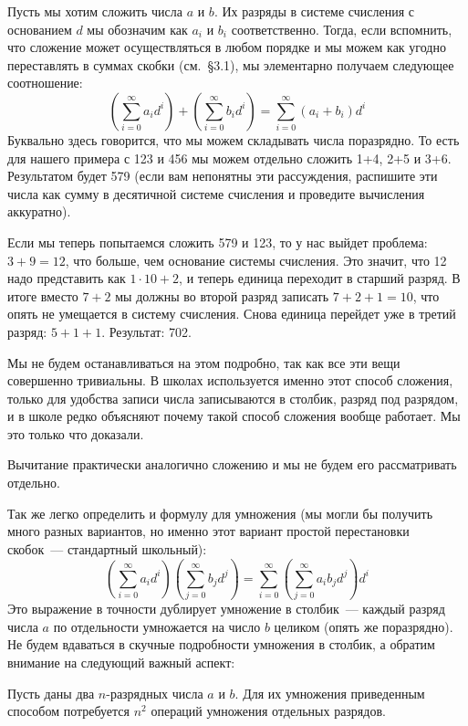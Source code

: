 Пусть мы хотим сложить числа $a$ и $b$. Их разряды в системе счисления с основанием $d$ мы обозначим как $a_i$ и $b_i$ соответственно. Тогда, если вспомнить, что сложение может осуществляться в любом порядке и мы можем как угодно переставлять в суммах скобки (см.~\S3.1), мы элементарно получаем следующее соотношение:
$$\left(\sum_{i=0}^\infty a_i d^i\right) + \left(\sum_{i=0}^\infty b_i d^i\right) = \sum_{i=0}^\infty (a_i + b_i) d^i$$
Буквально здесь говорится, что мы можем складывать числа поразрядно. То есть для нашего примера с 123 и 456 мы можем отдельно сложить 1+4, 2+5 и 3+6. Результатом будет 579 (если вам непонятны эти рассуждения, распишите эти числа как сумму в десятичной системе счисления и проведите вычисления аккуратно).

Если мы теперь попытаемся сложить 579 и 123, то у нас выйдет проблема: $3+9=12$, что больше, чем основание системы счисления. Это значит, что 12 надо представить как $1\cdot10 + 2$, и теперь единица переходит в старший разряд. В итоге вместо $7+2$ мы должны во второй разряд записать $7+2+1=10$, что опять не умещается в систему счисления. Снова единица перейдет уже в третий разряд: $5+1+1$. Результат: 702.

Мы не будем останавливаться на этом подробно, так как все эти вещи совершенно тривиальны. В школах используется именно этот способ сложения, только для удобства записи числа записываются в столбик, разряд под разрядом, и в школе редко объясняют почему такой способ сложения вообще работает. Мы это только что доказали.

Вычитание практически аналогично сложению и мы не будем его рассматривать отдельно.

Так же легко определить и формулу для умножения (мы могли бы получить много разных вариантов, но именно этот вариант простой перестановки скобок~— стандартный школьный):
$$\left(\sum_{i=0}^\infty a_i d^i \right)\left( \sum_{j=0}^\infty b_j d^j \right) = \sum_{i=0}^\infty \left(\sum_{j=0}^\infty a_i b_j d^j \right)d^i$$
Это выражение в точности дублирует умножение в столбик~— каждый разряд числа $a$ по отдельности умножается на число $b$ целиком (опять же поразрядно). Не будем вдаваться в скучные подробности умножения в столбик, а обратим внимание на следующий важный аспект:

\begin{exercise}
Пусть даны два $n$-разрядных числа $a$ и $b$. Для их умножения приведенным способом потребуется $n^2$ операций умножения отдельных разрядов.
\end{exercise}

